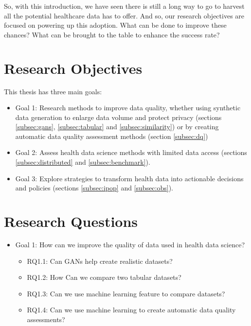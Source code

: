 So, with this introduction, we have seen there is still a long way to go to harvest all the potential healthcare data has to offer. And so, our research objectives are focused on powering up this adoption. What can be done to improve these chances? What can be brought to the table to enhance the success rate?







\section{Research Objectives}
This thesis has three main goals:


\begin{itemize}
    \item Goal 1: Research methods to improve data quality, whether using synthetic data generation to enlarge data volume and protect privacy (sections \ref{subsec:gans}, \ref{subsec:tabular} and \ref{subsec:similarity}) or by creating automatic data quality assessment methods (section \ref{subsec:dq})

    \item Goal 2: Assess health data science  methods with limited data access (sections \ref{subsec:distributed} and \ref{subsec:benchmark}).

    \item Goal 3: Explore strategies to transform health data into actionable decisions and policies (sections  \ref{subsec:ipop} and \ref{subsec:obs}).
\end{itemize}


\section{Research Questions}

\begin{itemize}
    \item Goal 1: How can we improve the quality of data used in health data science?
    \begin{itemize}
        \item RQ1.1: Can GANs help create realistic datasets?
        \item RQ1.2: How Can we compare two tabular datasets?
        \item RQ1.3: Can we use machine learning feature to compare datasets?
        \item RQ1.4: Can we use machine learning to create automatic data quality assessments?
    \end{itemize}
\end{itemize}

